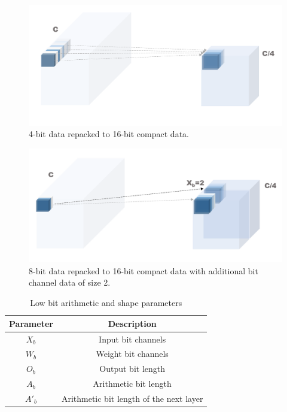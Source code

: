 \begin{figure}
    \centering
    \includegraphics[width=1\linewidth]{inc/3_low_numeric_convolution_neural_network/figure/re_pack1.png}
    \caption{4-bit data repacked to 16-bit compact data.}
    \label{fig:re_pack1}
\end{figure}
\begin{figure}[h]
    \centering
    \includegraphics[width=1\linewidth]{inc/3_low_numeric_convolution_neural_network/figure/re_pack2.png}
    \caption{8-bit data repacked to 16-bit compact data with additional bit channel data of size 2.}
    \label{fig:re_pack2}
\end{figure}
\begin{table}[h]
    \caption{Low bit arithmetic and shape parameters}
    \label{tab:bit_shape}
    \centering
    \footnotesize 
        \begin{tabular}{cc}
        \toprule
        Parameter & Description \\
        \midrule
        $X_b$ & Input bit channels\\
        $W_b$ & Weight bit channels\\
        $O_b$ & Output bit length\\
        $A_b$ & Arithmetic bit length\\
        $A'_b$ & Arithmetic bit length of the next layer\\
        \bottomrule
        \end{tabular}
\end{table}

